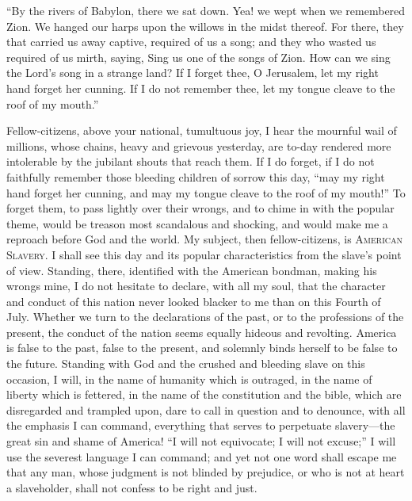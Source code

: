 ``By the rivers of Babylon, there we sat down. Yea! we wept when we
remembered Zion. We hanged our harps upon the willows in the midst
thereof. For there, they that carried us away captive, required of us
a song; and they who wasted us required of us mirth, saying, Sing us
one of the songs of Zion. How can we sing the Lord's song in a strange
land? If I forget thee, O Jerusalem, let my right hand forget her
cunning. If I do not remember thee, let my tongue cleave to the roof
of my mouth.''

Fellow-citizens, above your national, tumultuous joy, I hear the
mournful wail of millions, whose chains, heavy and grievous yesterday,
are to-day rendered more intolerable by the jubilant shouts that reach
them. If I do forget, if I do not faithfully remember those bleeding
children of sorrow this day, ``may my right hand forget her cunning,
and may my tongue cleave to the roof of my mouth!'' To forget them, to
pass lightly over their wrongs, and to chime in with the popular
theme, would be treason most scandalous and shocking, and would make
me a reproach before God and the world. My subject, then
fellow-citizens, is \textsc{American Slavery}. I shall see this day
and its popular characteristics from the slave's point of view.
Standing, there, identified with the American bondman, making his
wrongs mine, I do not hesitate to declare, with all my soul, that the
character and conduct of this nation never looked blacker to me than
on this Fourth of July. Whether we turn to the declarations of the
past, or to the professions of the present, the conduct of the nation
seems equally hideous and revolting. America is false to the past,
false to the present, and solemnly binds herself to be false to the
future. Standing with God and the crushed and bleeding slave on this
occasion, I will, in the name of humanity which is outraged, in the
name of liberty which is fettered, in the name of the constitution and
the bible, which are disregarded and trampled upon, dare to call in
question and to denounce, with all the emphasis I can command,
everything that serves to perpetuate slav\-er\-y---the great sin and
shame of America! ``I will not equivocate; I will not excuse;'' I will
use the severest language I can  command; and yet not one
word shall escape me that any man, whose judgment is not blinded by
prejudice, or who is not at heart a slaveholder, shall not confess to
be right and just.

